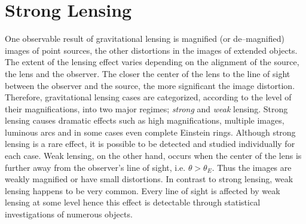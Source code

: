 \documentclass[a4wide,12pt]{book}
\begin{document}
{ %

\section{Strong Lensing}
One observable result of gravitational lensing is magnified (or de--magnified) images of point sources, the other distortions in the images of extended objects. The extent of the lensing effect varies depending on the alignment of the source, the lens and the observer. The closer the center of the lens to the line of sight between the observer and the source, the more significant the image distortion. Therefore, gravitational lensing cases are categorized, according to the level of their magnifications, into two major regimes; \emph{strong} and \emph{weak} lensing. Strong lensing causes dramatic effects such as high magnifications, multiple images, luminous arcs and in some cases even complete Einstein rings. Although strong lensing is a rare effect, it is possible to be detected and studied individually for each case. Weak lensing, on the other hand, occurs when the center of the lens is further away from the observer's line of sight, i.e. $\theta > \theta_E$. Thus the images are weakly magnified or have small distortions. In contrast to strong lensing, weak lensing happens to be very common. Every line of sight is affected by weak lensing at some level hence this effect is detectable through statistical investigations of numerous objects. 

}
\end{document}
